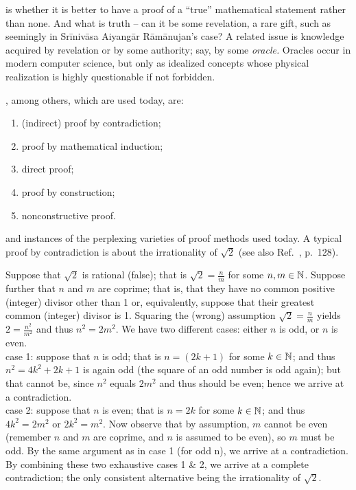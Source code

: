  is whether it is better to have a proof of a ``true'' mathematical statement rather than none.
And what is truth -- can it be some revelation, a rare gift, such as seemingly in Sr\={i}niv\={a}sa Aiyang\={a}r
R\={a}m\={a}nujan's case?
{A related issue} is knowledge acquired by revelation or by some authority; say, by some {\em oracle.}
Oracles occur in modern computer science,
but only as idealized concepts whose physical realization is highly
questionable if not forbidden.

, among others, which are used today, are:
\begin{enumerate}
\item
(indirect) proof by contradiction;
\item
proof by mathematical induction;
\item
direct proof;
\item
proof by construction;
\item
nonconstructive proof.
\end{enumerate}


 and instances of the perplexing varieties of proof methods used today.
A typical proof by contradiction is about the irrationality of $\sqrt{2}$
(see also Ref.~\cite{Alsina}, p.~128).

{\color{OliveGreen}
\bproof
Suppose that $\sqrt{2}$ is rational (false); that is
$\sqrt{2} = \frac{n}{m}$ for some $n, m \in {\Bbb N}$.
Suppose further that $n$ and $m$ are coprime;
that is, that they have no common positive (integer) divisor other than 1 or, equivalently,
suppose that their greatest common (integer) divisor is 1.
Squaring the  (wrong) assumption $\sqrt{2} = \frac{n}{m}$ yields $2= \frac{n^2}{m^2}$ and thus $n^2 =2m^2$.
We have two different cases: either $n$ is odd, or $n$ is even.
 \\
case 1: suppose that $n$ is odd; that is $n=(2k+1)$ for some $k\in {\Bbb N}$; and thus
$n^2 = 4k^2+2k+1$ is again odd (the square of an odd number is odd again); but that cannot be,
since $n^2$ equals $2m^2$ and thus should be even; hence we arrive at a contradiction.
\\
case 2:  suppose that $n$ is even;  that is $n=2k$ for some $k\in {\Bbb N}$; and thus
$4k^2 = 2m^2$ or $2k^2 = m^2$.
Now observe that by assumption, $m$ cannot be even (remember  $n$ and $m$ are coprime, and
$n$ is assumed to be even), so $m$ must be odd. By the same argument as in case 1 (for odd n),
we arrive at a contradiction.
By combining these two exhaustive cases 1 \& 2, we arrive at a complete contradiction;
the only consistent alternative being the irrationality of $\sqrt{2}$.
\eproof
}





